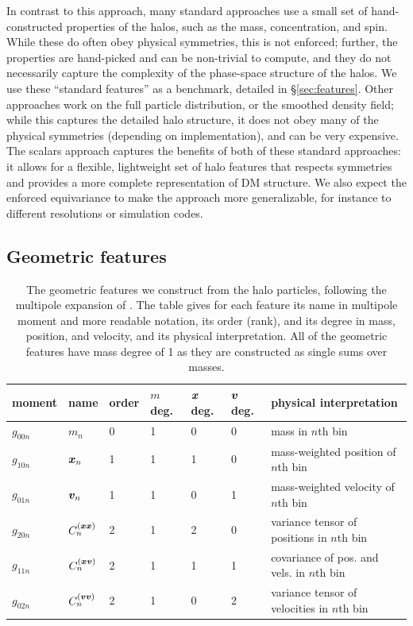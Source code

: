 In contrast to this approach, many standard approaches use a small set of hand-constructed properties of the halos, such as the mass, concentration, and spin.
While these do often obey physical symmetries, this is not enforced; further, the properties are hand-picked and can be non-trivial to compute, and they do not necessarily capture the complexity of the phase-space structure of the halos.
We use these ``standard features'' as a benchmark, detailed in \S\ref{sec:features}.
Other approaches work on the full particle distribution, or the smoothed density field; while this captures the detailed halo structure, it does not obey many of the physical symmetries (depending on implementation), and can be very expensive.
The scalars approach captures the benefits of both of these standard approaches: it allows for a flexible, lightweight set of halo features that respects symmetries and provides a more complete representation of DM structure.
We also expect the enforced equivariance to make the approach more generalizable, for instance to different resolutions or simulation codes.


\subsection{Geometric features}
\label{sec:geometric_features}

\begin{table}
    \caption{The geometric features we construct from the \dark halo particles, following the multipole expansion of . The table gives for each feature its name in multipole moment and more readable notation, its order (rank), and its degree in mass, position, and velocity, and its physical interpretation. All of the geometric features have mass degree of 1 as they are constructed as single sums over masses.}
    \label{tab:geos}
    \vspace{0.5em}
    \centering
    \begin{tabular}{|l|l|l|l|l|l|l|}
    \hline
    moment & name & order & $m$ deg. & $\bm{x}$ deg. & $\bm{v}$ deg. & physical interpretation \\
    \hline
    $g_{00n}$ & $m_n$ & 0 & 1 & 0 & 0 & mass in $n$th bin \\
    $g_{10n}$ & $\bm{x}_n$ & 1 & 1 & 1 & 0 & mass-weighted position of $n$th bin \\
    $g_{01n}$ & $\bm{v}_n$ & 1 & 1 & 0 & 1 & mass-weighted velocity of $n$th bin \\
    $g_{20n}$ & $C^{(\bm{x}\bm{x})}_n$ & 2 & 1 & 2 & 0 & variance tensor of positions in $n$th bin \\
    $g_{11n}$ & $C^{(\bm{x}\bm{v})}_n$ & 2 & 1 & 1 & 1 & covariance of pos. and vels. in $n$th bin \\
    $g_{02n}$ & $C^{(\bm{v}\bm{v})}_n$ & 2 & 1 & 0 & 2 & variance tensor of velocities in $n$th bin \\
    \hline
    \end{tabular}
\end{table}

